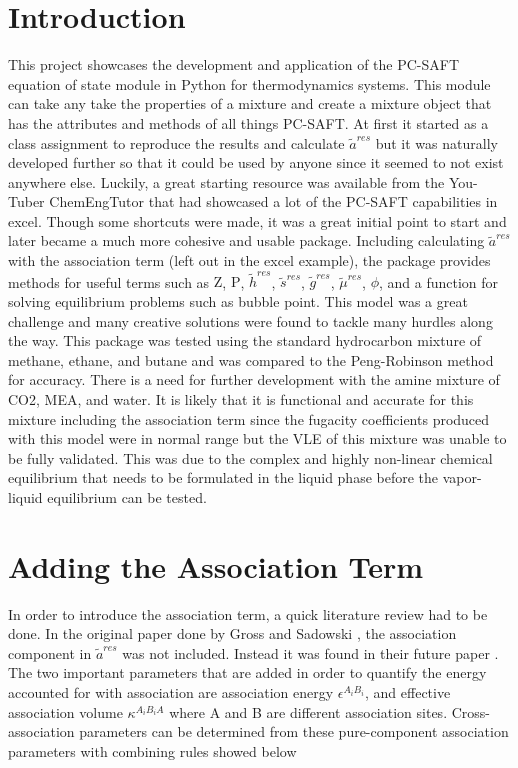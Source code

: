 \documentclass[12pt, letterpaper]{article}
\begin{document}
\section{Introduction}
This project showcases the development and application of the PC-SAFT equation of state module in Python for thermodynamics systems. This module can take any take the properties of a mixture and create a mixture object that has the attributes and methods of all things PC-SAFT. At first it started as a class assignment to reproduce the results and calculate $\tilde{a}^{res}$ but it was naturally developed further so that it could be used by anyone since it seemed to not exist anywhere else. Luckily, a great starting resource was available from the You-Tuber ChemEngTutor \cite{ChemEngTutor} that had showcased a lot of the PC-SAFT capabilities in excel. Though some shortcuts were made, it was a great initial point to start and later became a much more cohesive and usable package. Including calculating $\tilde{a}^{res}$ with the association term (left out in the excel example), the package provides methods for useful terms such as $\text{Z}$, $\text{P}$, $\tilde{h}^{res}$, $\tilde{s}^{res}$, $\tilde{g}^{res}$, $\tilde{\mu}^{res}$, $\phi$, and a function for solving equilibrium problems such as bubble point. This model was a great challenge and many creative solutions were found to tackle many hurdles along the way. This package was tested using the standard hydrocarbon mixture of methane, ethane, and butane and was compared to the Peng-Robinson method for accuracy. There is a need for further development with the amine mixture of CO2, MEA, and water. It is likely that it is functional and accurate for this mixture including the association term since the fugacity coefficients produced with this model were in normal range but the VLE of this mixture was unable to be fully validated. This was due to the complex and highly non-linear chemical equilibrium that needs to be formulated in the liquid phase before the vapor-liquid equilibrium can be tested.

\section{Adding the Association Term}
In order to introduce the association term, a quick literature review had to be done. In the original paper done by Gross and Sadowski \cite{Gross2001-ow}, the association component in $\tilde{a}^{res}$ was not included. Instead it was found in their future paper \cite{Gross2002-nq}. The two important parameters that are added in order to quantify the energy accounted for with association are association energy $\epsilon^{A_iB_i}$, and effective association volume $\kappa^{A_{i}B_{i}A}$ where A and B are different association sites. Cross-association parameters can be determined from these pure-component association parameters with combining rules showed below
\end{document}
